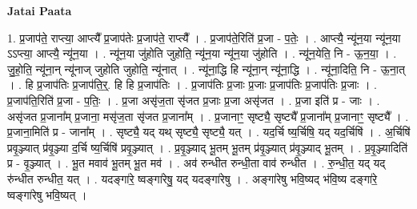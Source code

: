 \documentclass[17pt]{extarticle}
\begin{document}
\textbf{Jatai Paata} \newline

1. प्र॒जाप॑ते॒ राप्त्या॒ आप्त्यै᳚ प्र॒जाप॑तेः प्र॒जाप॑ते॒ राप्त्यै᳚ । . प्र॒जाप॑ते॒रिति॑ प्र॒जा - प॒तेः॒ । . आप्त्यै॒ न्यू॑न॒या न्यू॑न॒या ऽऽप्त्या॒ आप्त्यै॒ न्यू॑न॒या । . न्यू॑न॒या जु॑होति जुहोति॒ न्यू॑न॒या न्यू॑न॒या जु॑होति । . न्यू॑न॒येति॒ नि - ऊ॒न॒या॒ । . जु॒हो॒ति॒ न्यू॑ना॒न् न्यू॑नाज् जुहोति जुहोति॒ न्यू॑नात् । . न्यू॑ना॒द्धि हि न्यू॑ना॒न् न्यू॑ना॒द्धि । . न्यू॑ना॒दिति॒ नि - ऊ॒ना॒त् । . हि प्र॒जाप॑तिः प्र॒जाप॑ति॒र्॒. हि हि प्र॒जाप॑तिः । . प्र॒जाप॑तिः प्र॒जाः प्र॒जाः प्र॒जाप॑तिः प्र॒जाप॑तिः प्र॒जाः । . प्र॒जाप॑ति॒रिति॑ प्र॒जा - प॒तिः॒ । . प्र॒जा असृ॑ज॒ता सृ॑जत प्र॒जाः प्र॒जा असृ॑जत । . प्र॒जा इति॑ प्र - जाः । . असृ॑जत प्र॒जाना᳚म् प्र॒जाना॒ मसृ॑ज॒ता सृ॑जत प्र॒जाना᳚म् । . प्र॒जानाꣳ॒॒ सृष्ट्यै॒ सृष्ट्यै᳚ प्र॒जाना᳚म् प्र॒जानाꣳ॒॒ सृष्ट्यै᳚ । . प्र॒जाना॒मिति॑ प्र - जाना᳚म् । . सृष्ट्यै॒ यद् यथ् सृष्ट्यै॒ सृष्ट्यै॒ यत् । . यद॒र्चि ष्य॒र्चिषि॒ यद् यद॒र्चिषि॑ । . अ॒र्चिषि॑ प्रवृ॒ञ्ज्यात् प्र॑वृ॒ञ्ज्या द॒र्चि ष्य॒र्चिषि॑ प्रवृ॒ञ्ज्यात् । . प्र॒वृ॒ञ्ज्याद् भू॒तम् भू॒तम् प्र॑वृ॒ञ्ज्यात् प्र॑वृ॒ञ्ज्याद् भू॒तम् । . प्र॒वृ॒ञ्ज्यादिति॑ प्र - वृ॒ञ्ज्यात् । . भू॒त मवाव॑ भू॒तम् भू॒त मव॑ । . अव॑ रुन्धीत रुन्धी॒ता वाव॑ रुन्धीत । . रु॒न्धी॒त॒ यद् यद् रु॑न्धीत रुन्धीत॒ यत् । . यदङ्गा॑रे॒ ष्वङ्गा॑रेषु॒ यद् यदङ्गा॑रेषु । . अङ्गा॑रेषु भवि॒ष्यद् भ॑वि॒ष्य दङ्गा॑रे॒ ष्वङ्गा॑रेषु भवि॒ष्यत् । \newline
\end{document}

